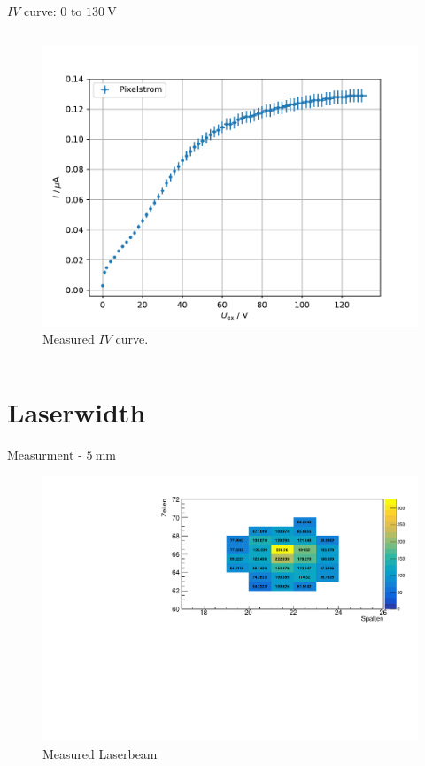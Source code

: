 \begin{frame}{ $IV$ curve: $0$ to $\SI{130}{\volt}$}
\begin{columns}
   \begin{column}{0.48\textwidth}
     \begin{figure}
       \centering
       \includegraphics[width=1.05\textwidth]{./iv_curve_0_130_V.pdf}
       \caption{Measured $IV$ curve. }
       \label{ fig: iv_curve_measured}
     \end{figure}
   \end{column}

  \end{columns}

\end{frame}

\section{Laserwidth}

\begin{frame}{ Measurment - $\SI{5}{\milli\meter}$ }

  \begin{figure}
    \centering
    \includegraphics[width=\textwidth]{./5_mm_measurment_plot.pdf}
    \caption{Measured Laserbeam }
    \label{ fig: 5_mm }
  \end{figure}

\end{frame}


